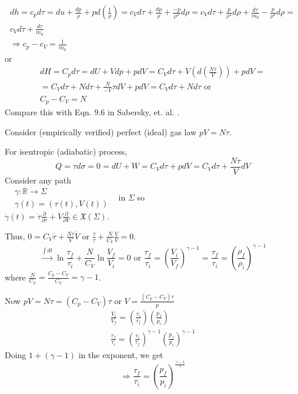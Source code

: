 \documentclass[twoside,landscape,10pt]{amsart}
\theoremstyle{plain}
\theoremstyle{definition}
\theoremstyle{remark}
\theoremstyle{remark}
\begin{document}
\begin{multicols*}{2}
\[
\begin{gathered}
dh = c_p d\tau = du + \frac{dp}{ \rho } + p d\left(\frac{1}{\rho} \right) = c_V d\tau + \frac{dp}{\rho } + \frac{-p}{\rho^2} d\rho = c_V d\tau + \frac{p}{\rho^2 } d\rho + \frac{d\tau }{m_0} - \frac{p}{\rho^2 } d\rho = \\
c_V d\tau + \frac{ d\tau}{m_0} \\
\Longrightarrow c_p - c_V = \frac{1}{m_0}
\end{gathered}
\]
or
\begin{equation}
\begin{gathered}
dH = C_p d\tau = dU + Vdp + pdV = C_V d\tau + V (d\left(\frac{N\tau}{V}\right) ) + p dV = \\
= C_V d\tau + Nd\tau + \frac{N}{-V} \tau dV + pdV = C_V d\tau + Nd\tau \text{ or }  \\ 
\boxed{ C_p - C_V = N}
\end{gathered}
\end{equation}
Compare this with Eqn. 9.6 in Sabersky, et. al. \cite{SAHG1998}.

Consider (empirically verified) perfect (ideal) gas law $pV = N\tau$. 

For isentropic (adiabatic) process, 
\[
Q = \tau d\sigma = 0 = dU + W = C_V d\tau + pdV = C_V d\tau + \frac{N\tau}{V} dV 
\]
Consider any path \\
$\begin{aligned} 
& \gamma : \mathbb{R} \to \Sigma \\
& \gamma(t) = (\tau(t), V(t)) \end{aligned}$ \qquad \, in $\Sigma$ so \\
$\dot{\gamma}(t) = \dot{\tau} \frac{ \partial }{ \partial \tau } + \dot{V} \frac{ \partial }{ \partial V} \in \mathfrak{X}(\Sigma)$.

Thus, $0 = C_V \dot{\tau} + \frac{N\tau}{V} \dot{V}$ or $\frac{ \dot{\tau}}{\tau} + \frac{N}{C_V}\frac{\dot{V}}{V} = 0$.
\[
\xrightarrow{\int dt} \ln{ \frac{ \tau_f}{\tau_i} } + \frac{N}{C_V} \ln{ \frac{V_f}{V_i} }=  0 \text{ or } \frac{\tau_f}{\tau_i} = \left( \frac{V_i}{V_f} \right)^{\gamma - 1} = \frac{\tau_f}{\tau_i} = \left( \frac{\rho_f}{\rho_i} \right)^{\gamma - 1}
\]
where $\frac{N}{C_V} = \frac{C_p - C_V}{C_V} = \gamma -1$.

Now $pV = N\tau = (C_p - C_V)\tau$ or $V= \frac{ (C_p - C_V) \tau}{p}$
\[
\begin{gathered}
\frac{V_i}{V_f} = \left( \frac{\tau_i}{\tau_f} \right) \left( \frac{p_f}{p_i} \right) \\
\frac{\tau_f}{\tau_i} = \left( \frac{\tau_i}{\tau_f} \right)^{\gamma -1} \left( \frac{p_f}{p_i} \right)^{\gamma -1}
\end{gathered} 
\]
Doing $1 + (\gamma - 1)$ in the exponent, we get
\begin{equation}
\Longrightarrow \boxed{ \frac{\tau_f}{\tau_i} = \left( \frac{p_f}{p_i} \right)^{\frac{\gamma -1 }{\gamma } } }
\end{equation}



\end{multicols*}
\end{document}
